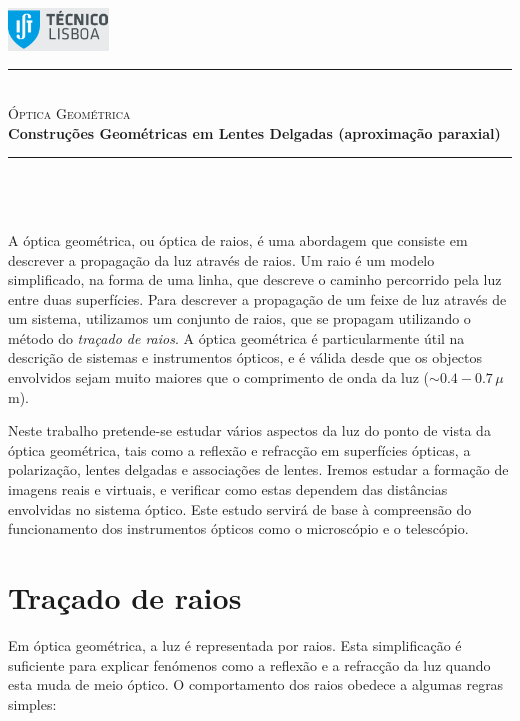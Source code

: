 \documentclass[a4paper,12pt]{article}      %
\author{Prof. Bernardo B. Carvalho}
\date{ Outubro 2012}
\newcommand{\HRule}{\rule{\linewidth}{0.5mm}}
\begin{document}
 

	\includegraphics[width=0.2\textwidth]{../logo-ist}%

	\HRule \\[0.5cm]
	{ \huge \sf  \textsc{Óptica Geométrica}} \\[0.4cm] %
	{ \large \bfseries Construções Geométricas em Lentes Delgadas (aproximação paraxial)}\\
	\HRule \\%

\section{}
A óptica geométrica, ou óptica de raios, é uma abordagem que consiste em descrever a propagação da luz através de raios. Um raio é um modelo simplificado, na forma de uma linha, que descreve o caminho percorrido pela luz entre duas superfícies. Para descrever a propagação de um feixe de luz através de um sistema, utilizamos um conjunto de raios, que se propagam utilizando o método do \emph{traçado de raios}.
A óptica geométrica é particularmente útil na descrição de sistemas e instrumentos ópticos, e é válida desde que os objectos envolvidos sejam muito maiores que o comprimento de onda da luz ($\sim 0.4-0.7\, \mu$m).

Neste trabalho pretende-se estudar vários aspectos da luz do ponto de vista da óptica geométrica, tais como a reflexão e refracção em superfícies ópticas, a polarização, lentes delgadas e associações de lentes. Iremos estudar a formação de imagens reais e virtuais, e verificar como estas dependem das distâncias envolvidas no sistema óptico. Este estudo servirá de base à compreensão do funcionamento dos instrumentos ópticos como o microscópio e o telescópio.

\section{\sf Traçado de raios}
Em óptica geométrica, a luz é representada por raios. Esta simplificação é suficiente para explicar fenómenos como a reflexão e a refracção da luz quando esta muda de meio óptico. O comportamento dos raios obedece a algumas regras simples:
\end{document}
